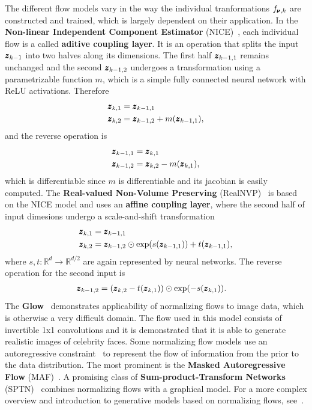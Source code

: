 The different flow models vary in the way the individual tranformations $f_{\pmb{{\nu}},k}$ are constructed and trained, which is largely dependent on their application. In the \textbf{Non-linear Independent Component Estimator} (NICE)~\cite{dinh2014nice}, each individual flow is a called \textbf{aditive coupling layer}. It is an operation that splits the input $\pmb{{z}}_{k-1}$ into two halves along its dimensions. The first half $\pmb{{z}}_{k-1,1}$ remains unchanged and the second $\pmb{{z}}_{k-1,2}$ undergoes a transformation using a parametrizable function $m$, which is a simple fully connected neural network with ReLU activations. Therefore
\begin{align}
    \pmb{{z}}_{k,1} & = \pmb{{z}}_{k-1,1} \\
    \pmb{{z}}_{k,2} & = \pmb{{z}}_{k-1,2} + m(\pmb{{z}}_{k-1,1}), 
\end{align}
and the reverse operation is 
\begin{align}
    \pmb{{z}}_{k-1,1} & = \pmb{{z}}_{k,1} \\
    \pmb{{z}}_{k-1,2} & = \pmb{{z}}_{k,2} - m(\pmb{{z}}_{k,1}), 
\end{align}
which is differentiable since $m$ is differentiable and its jacobian is easily computed. The \textbf{Real-valued Non-Volume Preserving} (RealNVP)~\cite{dinh2016density} is based on the NICE model and uses an \textbf{affine coupling layer}, where the second half of input dimesions undergo a scale-and-shift transformation
\begin{align}
    \pmb{{z}}_{k,1} & = \pmb{{z}}_{k-1,1} \\
    \pmb{{z}}_{k,2} & = \pmb{{z}}_{k-1,2} \odot \exp(s(\pmb{{z}}_{k-1,1})) + t(\pmb{{z}}_{k-1,1}), 
\end{align}
where $s,t:\mathbb{R}^d \rightarrow \mathbb{R}^{d/2}$ are again represented by neural networks. The reverse operation for the second input is 
\begin{align}
    \pmb{{z}}_{k-1,2} & = (\pmb{{z}}_{k,2}  - t(\pmb{{z}}_{k,1})) \odot \exp(-s(\pmb{{z}}_{k,1})).
\end{align}
The \textbf{Glow}~\cite{kingma2018glow} demonstrates applicability of normalizing flows to image data, which is otherwise a very difficult domain. The flow used in this model consists of invertible 1x1 convolutions and it is demonstrated that it is able to generate realistic images of celebrity faces. Some normalizing flow models use an autoregressive constraint~\cite{kingma2016improved} to represent the flow of information from the prior to the data distribution. The most prominent is the \textbf{Masked Autoregressive Flow} (MAF)~\cite{papamakariosMaskedAutoregressiveFlow2018}. A promising class of \textbf{Sum-product-Transform Networks} (SPTN)~\cite{pevny2020sum} combines normalizing flows with a graphical model. For a more complex overview and introduction to generative models based on normalizing flows, see~\cite{papamakariosNormalizingFlowsProbabilistic2019, kobyzevNormalizingFlowsIntroduction2020}. 

